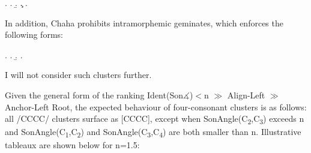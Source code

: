 \documentclass[12pt]{article}
\begin{document}
\ex. \a. 
     \b. 
     \c. 
     \z. \citep[(33a,34a,34b)]{rose.2000}

In addition, Chaha prohibits intramorphemic geminates, which enforces the following forms:

\ex. \a. 
     \b. 
     \z. \citep[(37a,b)]{rose.2000}

I will not consider such clusters further.

\bigskip

Given the general form of the ranking {\sc Ident(Son$\measuredangle$)}$<$n $\gg$ {\sc Align-Left} $\gg$ {\sc Anchor-Left Root}, the expected behaviour of four-consonant clusters is as follows: all /CCCC/ clusters surface as [CCCC], except when {\sc SonAngle}(C\textsubscript{2},C\textsubscript{3}) exceeds n and {\sc SonAngle}(C\textsubscript{1},C\textsubscript{2}) and {\sc SonAngle}(C\textsubscript{3},C\textsubscript{4}) are both smaller than n. Illustrative tableaux are shown below for n=1.5:
\end{document}
